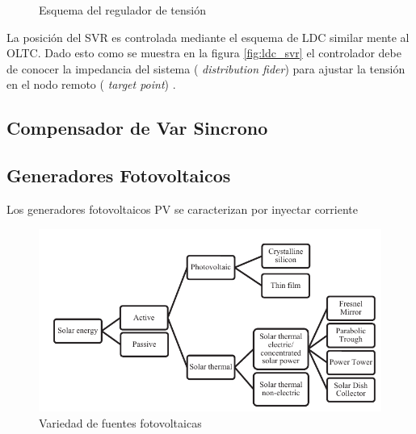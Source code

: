 \documentclass[12pt, letterpaper]{report}
\begin{document}
\begin{figure}[H]
	
\centering
{}
\hspace{5mm}
\hfill
{}
\caption{Esquema del regulador de tensión}
\label{fig:regulador}

\end{figure}

La posición del \ac{SVR} es  controlada  mediante el esquema de \ac{LDC} similar mente al \ac{OLTC}. Dado esto como se muestra en la figura \ref{fig:ldc_svr} el controlador  debe de conocer la impedancia del sistema ( \textit{distribution fider}) para ajustar la tensión en el nodo remoto ( \textit{target point}) \cite{Vkdulqj}.
\subsection{Compensador de Var Sincrono}

\subsection{Generadores Fotovoltaicos }

Los generadores fotovoltaicos \ac{PV} se caracterizan por inyectar corriente 

\begin{figure}[h]
\centering
\includegraphics[width=0.7\linewidth]{imagenes/cap_1/sistemas_solares}
\caption{Variedad de fuentes fotovoltaicas}
\label{fig:sistemas_solares}
\end{figure}
\end{document}
